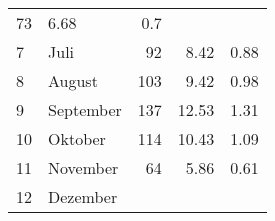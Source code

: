 \begin{longtable}{lXrrr}
       \num{73} &
       \num[round-mode=places,round-precision=2]{6,68} &
         \num[round-mode=places,round-precision=2]{0,7} \\

     7 &
     \multicolumn{1}{X}{ Juli   } &


       \num{92} &
       \num[round-mode=places,round-precision=2]{8,42} &
         \num[round-mode=places,round-precision=2]{0,88} \\

     8 &
     \multicolumn{1}{X}{ August   } &


       \num{103} &
       \num[round-mode=places,round-precision=2]{9,42} &
         \num[round-mode=places,round-precision=2]{0,98} \\

     9 &
     \multicolumn{1}{X}{ September   } &


       \num{137} &
       \num[round-mode=places,round-precision=2]{12,53} &
         \num[round-mode=places,round-precision=2]{1,31} \\

     10 &
     \multicolumn{1}{X}{ Oktober   } &


       \num{114} &
       \num[round-mode=places,round-precision=2]{10,43} &
         \num[round-mode=places,round-precision=2]{1,09} \\

     11 &
     \multicolumn{1}{X}{ November   } &


       \num{64} &
       \num[round-mode=places,round-precision=2]{5,86} &
         \num[round-mode=places,round-precision=2]{0,61} \\

     12 &
     \multicolumn{1}{X}{ Dezember   } &



\end{longtable}
